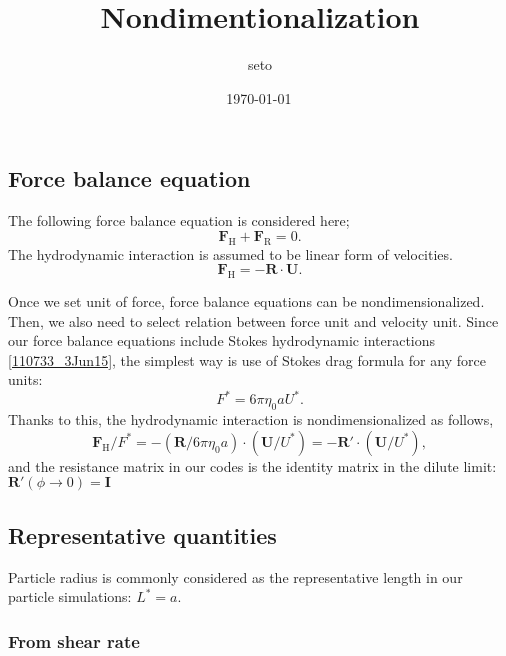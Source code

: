 \documentclass[fontsize=11pt]{scrartcl}
\title{Nondimentionalization}
\date{\shortdate\today \, \ampmtime }
\author{seto}
\begin{document}
\maketitle

\subsection*{Force balance equation}

The following force balance equation is considered here;
\begin{equation}
 \bm{F}_{\mathrm{H}} +  \bm{F}_{\mathrm{R}}  = 0.
\end{equation}
%
The hydrodynamic interaction is
assumed to be linear form of velocities.
%
\begin{equation}
 \bm{F}_{\mathrm{H}} = - \bm{R}\cdot\bm{U}.\label{110733_3Jun15}
\end{equation}

Once we set unit of force,
force balance equations can be nondimensionalized.
%
Then, we also need to select
relation between force unit and velocity unit.
%
Since our force balance equations include
Stokes  hydrodynamic interactions \eqref{110733_3Jun15},
the simplest way is use of Stokes drag formula
for any force units:
\begin{equation}
 F^{\ast} = 6 \pi \eta_{0} a U^{\ast}.\label{220656_3Jun15}
\end{equation}
%
Thanks to this,
the hydrodynamic interaction is nondimensionalized as follows,
\begin{equation}
 \bm{F}_{\mathrm{H}}/F^{\ast}
  = -(\bm{R}/6\pi\eta_0 a) \cdot (\bm{U}/U^{\ast})
     = -\bm{R}' \cdot (\bm{U}/U^{\ast}),
\end{equation}
%
and the resistance matrix in our codes
is the identity matrix
in the dilute limit: $\bm{R}'(\phi\to 0) = \bm{I}$





\subsection*{Representative quantities}

Particle radius is commonly considered
as the representative length in
our particle simulations: $L^{\ast} = a$.




\subsubsection*{From shear rate}
\end{document}
